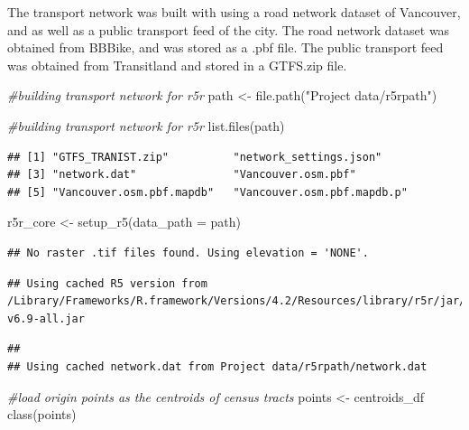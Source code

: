 \documentclass[
]{article}
\newenvironment{Shaded}{\begin{snugshade}}{\end{snugshade}}
\newcommand{\AttributeTok}[1]{\textcolor[rgb]{0.77,0.63,0.00}{#1}}
\newcommand{\CommentTok}[1]{\textcolor[rgb]{0.56,0.35,0.01}{\textit{#1}}}
\newcommand{\FunctionTok}[1]{\textcolor[rgb]{0.00,0.00,0.00}{#1}}
\newcommand{\NormalTok}[1]{#1}
\newcommand{\OtherTok}[1]{\textcolor[rgb]{0.56,0.35,0.01}{#1}}
\newcommand{\StringTok}[1]{\textcolor[rgb]{0.31,0.60,0.02}{#1}}
\begin{document}
The transport network was built with using a road network dataset of
Vancouver, and as well as a public transport feed of the city. The road
network dataset was obtained from BBBike, and was stored as a .pbf file.
The public transport feed was obtained from Transitland and stored in a
GTFS.zip file.

\begin{Shaded}
\begin{Highlighting}[]
\CommentTok{\#building transport network for r5r}
\NormalTok{path }\OtherTok{\textless{}{-}} \FunctionTok{file.path}\NormalTok{(}\StringTok{"Project data/r5rpath"}\NormalTok{)}

\CommentTok{\#building transport network for r5r}
\FunctionTok{list.files}\NormalTok{(path)}
\end{Highlighting}
\end{Shaded}

\begin{verbatim}
## [1] "GTFS_TRANIST.zip"          "network_settings.json"    
## [3] "network.dat"               "Vancouver.osm.pbf"        
## [5] "Vancouver.osm.pbf.mapdb"   "Vancouver.osm.pbf.mapdb.p"
\end{verbatim}

\begin{Shaded}
\begin{Highlighting}[]
\NormalTok{r5r\_core }\OtherTok{\textless{}{-}} \FunctionTok{setup\_r5}\NormalTok{(}\AttributeTok{data\_path =}\NormalTok{ path)}
\end{Highlighting}
\end{Shaded}

\begin{verbatim}
## No raster .tif files found. Using elevation = 'NONE'.
\end{verbatim}

\begin{verbatim}
## Using cached R5 version from /Library/Frameworks/R.framework/Versions/4.2/Resources/library/r5r/jar/r5-v6.9-all.jar
\end{verbatim}

\begin{verbatim}
## 
## Using cached network.dat from Project data/r5rpath/network.dat
\end{verbatim}

\begin{Shaded}
\begin{Highlighting}[]
\CommentTok{\#load origin points as the centroids of census tracts}
\NormalTok{points }\OtherTok{\textless{}{-}}\NormalTok{ centroids\_df}
\FunctionTok{class}\NormalTok{(points)}
\end{Highlighting}
\end{Shaded}
\end{document}
